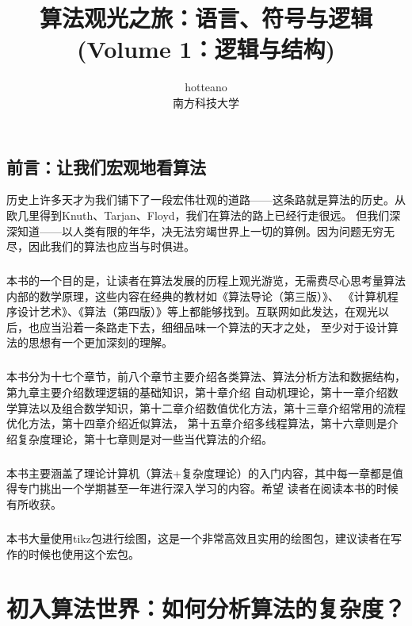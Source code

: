 \documentclass[12pt,a4paper,UTF16]{ctexbook}
\title{\bf{算法观光之旅：语言、符号与逻辑\\(Volume 1：逻辑与结构)}}
\author{hotteano\\
        南方科技大学}
\theoremstyle{plain}
\begin{document}
\setlength{\arrayrulewidth}{0.4pt}
\newcommand{\thickline}{\noalign{\hrule height 2pt}}

\maketitle
\section{前言：让我们宏观地看算法}
历史上许多天才为我们铺下了一段宏伟壮观的道路——这条路就是算法的历史。从欧几里得到Knuth、Tarjan、Floyd，我们在算法的路上已经行走很远。
但我们深深知道——以人类有限的年华，决无法穷竭世界上一切的算例。因为问题无穷无尽，因此我们的算法也应当与时俱进。
\paragraph{}本书的一个目的是，让读者在算法发展的历程上观光游览，无需费尽心思考量算法内部的数学原理，这些内容在经典的教材如《算法导论（第三版）》、
《计算机程序设计艺术》、《算法（第四版）》等上都能够找到。互联网如此发达，在观光以后，也应当沿着一条路走下去，细细品味一个算法的天才之处，
至少对于设计算法的思想有一个更加深刻的理解。
\paragraph{}本书分为十七个章节，前八个章节主要介绍各类算法、算法分析方法和数据结构，第九章主要介绍数理逻辑的基础知识，第十章介绍
自动机理论，第十一章介绍数学算法以及组合数学知识，第十二章介绍数值优化方法，第十三章介绍常用的流程优化方法，第十四章介绍近似算法，
第十五章介绍多线程算法，第十六章则是介绍复杂度理论，第十七章则是对一些当代算法的介绍。
\paragraph{}本书主要涵盖了理论计算机（算法+复杂度理论）的入门内容，其中每一章都是值得专门挑出一个学期甚至一年进行深入学习的内容。希望
读者在阅读本书的时候有所收获。
\paragraph{}本书大量使用tikz包进行绘图，这是一个非常高效且实用的绘图包，建议读者在写作的时候也使用这个宏包。

\tableofcontents

\chapter{初入算法世界：如何分析算法的复杂度？}  
\end{document}
